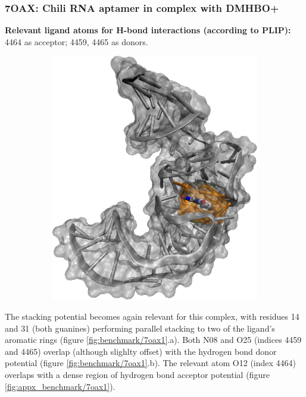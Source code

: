     \subsubsection{7OAX: Chili RNA aptamer in complex with DMHBO+}
      \textbf{Relevant ligand atoms for H-bond interactions (according to PLIP):} 4464 as acceptor; 4459, 4465 as donors.

      \begin{figure}[H] \centering
        \begin{subfigure}[c]{0.3\textwidth} \centering
          \includegraphics[width=1\textwidth]{figures/results/ps_rna/5bjo.png}
        \end{subfigure}
        \begin{subfigure}[c]{0.3\textwidth} \centering
        \end{subfigure}
      \end{figure}

      The stacking potential becomes again relevant for this complex, with residues 14 and 31 (both guanines) performing parallel stacking to two of the ligand's aromatic rings (figure \ref{fig:benchmark/7oax1}.a). Both N08 and O25 (indices 4459 and 4465) overlap (although slighlty offset) with the hydrogen bond donor potential (figure \ref{fig:benchmark/7oax1}.b). The relevant atom O12 (index 4464) overlaps with a dense region of hydrogen bond acceptor potential (figure \ref{fig:appx_benchmark/7oax1}).

